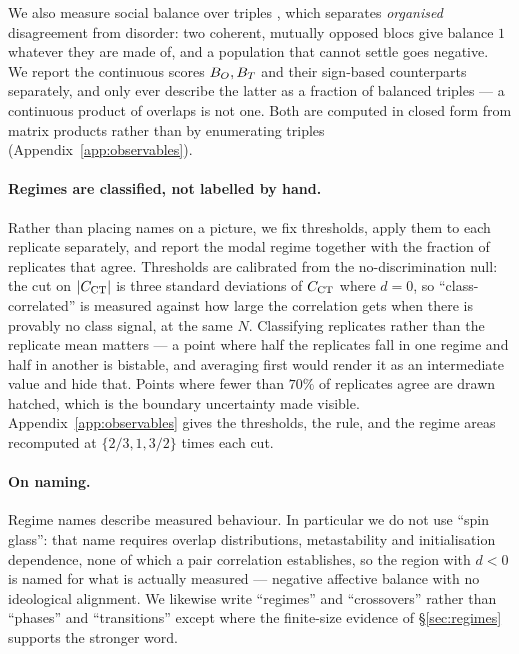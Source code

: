 We also measure social balance over triples
\citep{heider1946attitudes,cartwright1956structural}, which separates
\emph{organised} disagreement from disorder: two coherent, mutually opposed blocs
give balance $1$ whatever they are made of, and a population that cannot settle
goes negative. We report the continuous scores $B_{O},B_{T}$ and their sign-based
counterparts separately, and only ever describe the latter as a fraction of
balanced triples --- a continuous product of overlaps is not one. Both are
computed in closed form from matrix products rather than by enumerating triples
(Appendix~\ref{app:observables}).

\paragraph{Regimes are classified, not labelled by hand.}
Rather than placing names on a picture, we fix thresholds, apply them to each
replicate separately, and report the modal regime together with the fraction of
replicates that agree. Thresholds are calibrated from the no-discrimination
null: the cut on $|C_{\mathrm{CT}}|$ is three standard deviations of $C_{\mathrm{CT}}$ where $d=0$, so
``class-correlated'' is measured against how large the correlation gets when
there is provably no class signal, at the same $N$. Classifying replicates
rather than the replicate mean matters --- a point where half the replicates fall
in one regime and half in another is bistable, and averaging first would render
it as an intermediate value and hide that. Points where fewer than $70\%$ of
replicates agree are drawn hatched, which is the boundary uncertainty made
visible. Appendix~\ref{app:observables} gives the thresholds, the rule, and the
regime areas recomputed at $\{2/3,1,3/2\}$ times each cut.

\paragraph{On naming.}
Regime names describe measured behaviour. In particular we do not use
``spin glass'': that name requires overlap distributions, metastability and
initialisation dependence, none of which a pair correlation establishes, so the
region with $d<0$ is named for what is actually measured --- negative affective
balance with no ideological alignment. We likewise write ``regimes'' and
``crossovers'' rather than ``phases'' and ``transitions'' except where the
finite-size evidence of \S\ref{sec:regimes} supports the stronger word.
